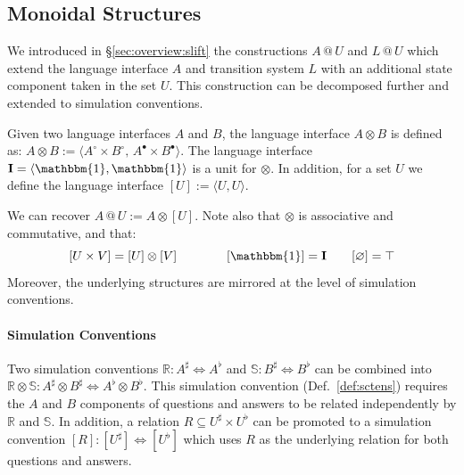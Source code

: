\documentclass[acmsmall,screen,review,anonymous]{acmart}
\newcommand{\que}{\circ}
\newcommand{\ans}{\bullet}
\begin{document}

\subsection{Monoidal Structures} \label{sec:overview:mon} %

We introduced in \S\ref{sec:overview:slift}
the constructions $A \mathbin@ U$ and $L \mathbin@ U$
which extend the language interface $A$ and transition system $L$
with an additional state component taken in the set $U$.
This construction can be decomposed further
and extended to simulation conventions.

\begin{definition} \label{def:litens} %
Given two language interfaces $A$ and $B$,
the language interface $A \otimes B$ is defined as:
$
  A \otimes B :=
    \langle A^\que \times B^\que, \,
            A^\ans \times B^\ans \rangle
$.
The language interface
$\mathbf{I} = \langle \mathbbm{1}, \mathbbm{1} \rangle$
is a unit for $\otimes$.
In addition, for a set $U$
we define the language interface
$[U] := \langle U, U \rangle$.
\end{definition}

We can recover
$A \mathbin@ U := A \otimes [U]$.
Note also that $\otimes$ is %
associative and commutative,
and that:
\[
  [U \times V] = [U] \otimes [V]
  \qquad \qquad
  [\mathbbm{1}] = \mathbf{I}
  \qquad
  [\varnothing] = \top
\]
Moreover,
the underlying structures
are mirrored at the level of simulation conventions.

\paragraph{Simulation Conventions} %

Two simulation conventions
$\mathbb{R} : A^\sharp \Leftrightarrow A^\flat$ and
$\mathbb{S} : B^\sharp \Leftrightarrow B^\flat$
can be combined into %
$
  \mathbb{R} \otimes \mathbb{S} :
  A^\sharp \otimes B^\sharp \Leftrightarrow
  A^\flat \otimes B^\flat
$.
This simulation convention
(Def.~\ref{def:sctens})
requires the $A$ and $B$ components
of questions and answers
to be related independently by $\mathbb{R}$ and $\mathbb{S}$.
In addition,
a relation $R \subseteq U^\sharp \times U^\flat$
can be promoted to a simulation convention
$
  [R] : [U^\sharp] \Leftrightarrow [U^\flat]
$
which uses $R$ as the underlying relation for both
questions and answers.
\end{document}
